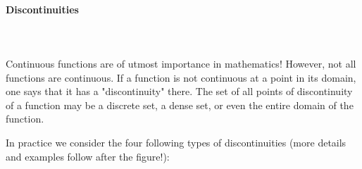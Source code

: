 	\paragraph{Discontinuities}\mbox{}\\\\
	Continuous functions are of utmost importance in mathematics! However, not all functions are continuous. If a function is not continuous at a point in its domain, one says that it has a "discontinuity" there. The set of all points of discontinuity of a function may be a discrete set, a dense set, or even the entire domain of the function.
	
	In practice we consider the four following types of discontinuities (more details and examples follow after the figure!):
	\begin{figure}[H]
		\centering
		\begin{tikzpicture}[x=0.75pt,y=0.75pt,yscale=-1,xscale=1]
		

\end{tikzpicture}
\end{figure}
